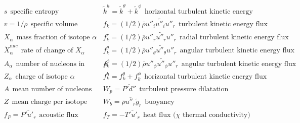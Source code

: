 \documentclass[10pt,paper=a4]{report}
\newcommand{\eht}{\overline}
\newcommand{\fht}{\widetilde}
\begin{document}
\begin{table*}
\begin{align}
& s \ \ \mbox{specific entropy}                                      & & \fht{k}^h = \fht{k}^\theta + \fht{k}^\phi \ \ \mbox{horizontal turbulent kinetic energy}                                    \nonumber \\
& v = 1/\rho \ \ \mbox{specific volume}                               & & f_k = (1/2)\eht{\rho} \fht{u''_i u''_i u''_r} \ \ \mbox{turbulent kinetic energy flux}                                    \nonumber \\    
& X_\alpha \ \ \mbox{mass fraction of isotope $\alpha$}               & & f_k^r = (1/2)\eht{\rho} \fht{u''_r u''_r u''_r} \ \ \mbox{radial turbulent kinetic energy flux}                          \nonumber \\
& \dot{X}_\alpha^{\mathrm nuc} \ \ \mbox{rate of change of $X_\alpha$}     & & f_k^\theta = (1/2)\eht{\rho} \fht{u''_\theta u''_\theta u''_r} \ \ \mbox{angular turbulent kinetic energy flux}              \nonumber \\    
& A_\alpha \ \ \mbox{number of nucleons in isotope $\alpha$}           & & f_k^\phi = (1/2)\eht{\rho} \fht{u''_\phi u''_\phi u''_r} \ \ \mbox{angular turbulent kinetic energy flux}                   \nonumber \\ 
& Z_\alpha \ \ \mbox{charge of isotope $\alpha$}                     & & f_k^h = f_k^\theta + f_k^\phi \ \ \mbox{horizontal turbulent kinetic energy flux}                                           \nonumber \\   
& A \ \ \mbox{mean number of nucleons per isotope}          & & W_p = \eht{P'd''} \ \ \mbox{turbulent pressure dilatation}      \nonumber \\                                            
& Z \ \ \mbox{mean charge per isotope}                     & &   W_b = \eht{\rho} \eht{u''_r} \fht{g}_r \ \ \mbox{buoyancy}          \nonumber  \\
& f_P = \eht{P' u'_r} \ \ \mbox{acoustic flux}                                    & &  f_T = -\eht{T'u'_r} \ \ \mbox{heat flux ($\chi$ thermal conductivity})             \nonumber 
\end{align} 
\end{table*}

\newpage
\end{document}

